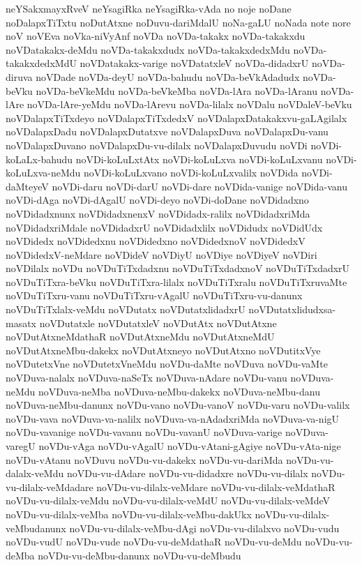 {neYSakxmayxRveV
neYsagiRka
neYsagiRka-vAda
no
noje
noDane
noDalapxTiTxtu
noDutAtxne
noDuvu-dariMdalU
noNa-gaLU
noNada
note
nore
noV
noVEva
noVka-niVyAnf
noVDa
noVDa-takakx
noVDa-takakxdu
noVDatakakx-deMdu
noVDa-takakxdudx
noVDa-takakxdedxMdu
noVDa-takakxdedxMdU
noVDatakakx-varige
noVDatatxleV
noVDa-didadxrU
noVDa-diruva
noVDade
noVDa-deyU
noVDa-bahudu
noVDa-beVkAdadudx
noVDa-beVku
noVDa-beVkeMdu
noVDa-beVkeMba
noVDa-lAra
noVDa-lAranu
noVDa-lAre
noVDa-lAre-yeMdu
noVDa-lArevu
noVDa-lilalx
noVDalu
noVDaleV-beVku
noVDalapxTiTxdeyo
noVDalapxTiTxdedxV
noVDalapxDatakakxvu-gaLAgilalx
noVDalapxDadu
noVDalapxDutatxve
noVDalapxDuva
noVDalapxDu-vanu
noVDalapxDuvano
noVDalapxDu-vu-dilalx
noVDalapxDuvudu
noVDi
noVDi-koLaLx-bahudu
noVDi-koLuLxtAtx
noVDi-koLuLxva
noVDi-koLuLxvanu
noVDi-koLuLxva-neMdu
noVDi-koLuLxvano
noVDi-koLuLxvalilx
noVDida
noVDi-daMteyeV
noVDi-daru
noVDi-darU
noVDi-dare
noVDida-vanige
noVDida-vanu
noVDi-dAga
noVDi-dAgalU
noVDi-deyo
noVDi-doDane
noVDidadxno
noVDidadxnunx
noVDidadxnenxV
noVDidadx-ralilx
noVDidadxriMda
noVDidadxriMdale
noVDidadxrU
noVDidadxlilx
noVDidudx
noVDidUdx
noVDidedx
noVDidedxnu
noVDidedxno
noVDidedxnoV
noVDidedxV
noVDidedxV-neMdare
noVDideV
noVDiyU
noVDiye
noVDiyeV
noVDiri
noVDilalx
noVDu
noVDuTiTxdadxnu
noVDuTiTxdadxnoV
noVDuTiTxdadxrU
noVDuTiTxra-beVku
noVDuTiTxra-lilalx
noVDuTiTxralu
noVDuTiTxruvaMte
noVDuTiTxru-vanu
noVDuTiTxru-vAgalU
noVDuTiTxru-vu-danunx
noVDuTiTxlalx-veMdu
noVDutatx
noVDutatxlidadxrU
noVDutatxlidudxsa-masatx
noVDutatxle
noVDutatxleV
noVDutAtx
noVDutAtxne
noVDutAtxneMdathaR
noVDutAtxneMdu
noVDutAtxneMdU
noVDutAtxneMbu-dakekx
noVDutAtxneyo
noVDutAtxno
noVDutitxVye
noVDutetxVne
noVDutetxVneMdu
noVDu-daMte
noVDuva
noVDu-vaMte
noVDuva-nalalx
noVDuva-naSeTx
noVDuva-nAdare
noVDu-vanu
noVDuva-neMdu
noVDuva-neMba
noVDuva-neMbu-dakekx
noVDuva-neMbu-danu
noVDuva-neMbu-danunx
noVDu-vano
noVDu-vanoV
noVDu-varu
noVDu-valilx
noVDu-vava
noVDuva-va-nalilx
noVDuva-va-nAdadxriMda
noVDuva-va-nigU
noVDu-vavanige
noVDu-vavanu
noVDu-vavanU
noVDuva-varige
noVDuva-varegU
noVDu-vAga
noVDu-vAgalU
noVDu-vAtani-gAgiye
noVDu-vAta-nige
noVDu-vAtanu
noVDuvu
noVDu-vu-dakekx
noVDu-vu-dariMda
noVDu-vu-dalalx-veMdu
noVDu-vu-dAdare
noVDu-vu-didadxre
noVDu-vu-dilalx
noVDu-vu-dilalx-veMdadare
noVDu-vu-dilalx-veMdare
noVDu-vu-dilalx-veMdathaR
noVDu-vu-dilalx-veMdu
noVDu-vu-dilalx-veMdU
noVDu-vu-dilalx-veMdeV
noVDu-vu-dilalx-veMba
noVDu-vu-dilalx-veMbu-dakUkx
noVDu-vu-dilalx-veMbudanunx
noVDu-vu-dilalx-veMbu-dAgi
noVDu-vu-dilalxvo
noVDu-vudu
noVDu-vudU
noVDu-vude
noVDu-vu-deMdathaR
noVDu-vu-deMdu
noVDu-vu-deMba
noVDu-vu-deMbu-danunx
noVDu-vu-deMbudu
}
